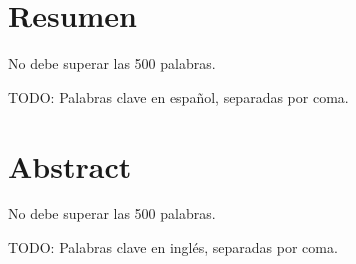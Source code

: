 \chapter*{Resumen}

\begin{abstractEs}

	No debe superar las 500 palabras.
	
\end{abstractEs}

\begin{keywordsEs}
	TODO: Palabras clave en español, separadas por coma.
\end{keywordsEs}


\chapter*{Abstract}

\begin{abstractEn}

	No debe superar las 500 palabras.

\end{abstractEn}

\begin{keywordsEn}
TODO: Palabras clave en inglés, separadas por coma.
\end{keywordsEn}


